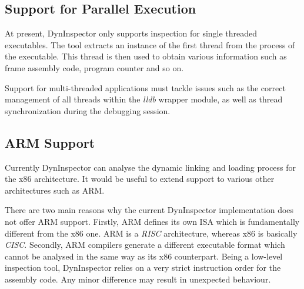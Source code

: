 \subsection{Support for Parallel Execution}

At present, DynInspector only supports inspection for single threaded executables. The tool extracts an instance of the first thread from the process of the executable. This thread is then used to obtain various information such as frame assembly code, program counter and so on. 

Support for multi-threaded applications must tackle issues such as the correct management of all threads within the \textit{lldb} wrapper module, as well as thread synchronization during the debugging session.

\subsection{ARM Support}

Currently DynInspector can analyse the dynamic linking and loading process for the x86 architecture. It would be useful to extend support to various other architectures such as ARM.

There are two main reasons why the current DynInspector implementation does not offer ARM support. Firstly, ARM defines its own ISA \cite{arm-manual} which is fundamentally different from the x86 one. ARM is a \textit{RISC} architecture, whereas x86 is basically \textit{CISC}. Secondly, ARM compilers generate a different executable format which cannot be analysed in the same way as its x86 counterpart. Being a low-level inspection tool, DynInspector relies on a very strict instruction order for the assembly code. Any minor difference may result in unexpected behaviour.
